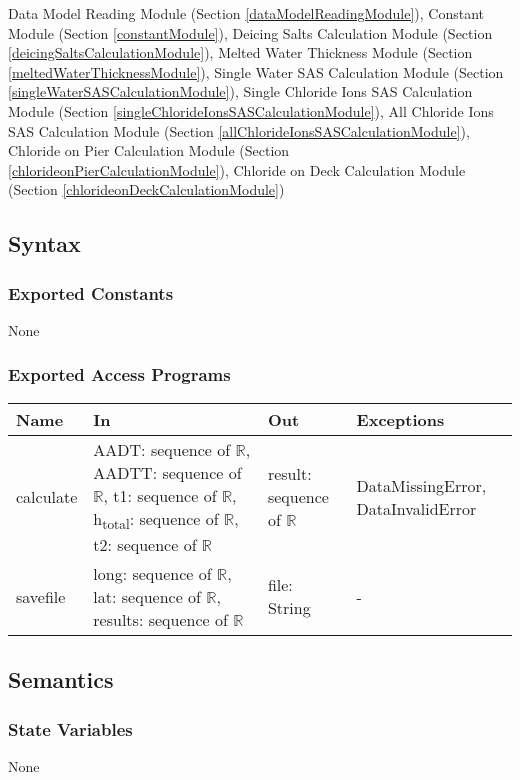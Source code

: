 \documentclass[12pt, titlepage]{article}
\begin{document}
Data Model Reading Module (Section \ref{dataModelReadingModule}), 
Constant Module (Section \ref{constantModule}), Deicing Salts Calculation Module (Section \ref{deicingSaltsCalculationModule}), Melted Water Thickness Module (Section \ref{meltedWaterThicknessModule}), Single Water SAS Calculation Module (Section \ref{singleWaterSASCalculationModule}), Single Chloride Ions SAS Calculation Module (Section \ref{singleChlorideIonsSASCalculationModule}), All Chloride Ions SAS Calculation Module (Section \ref{allChlorideIonsSASCalculationModule}), Chloride on Pier Calculation Module (Section \ref{chlorideonPierCalculationModule}),  Chloride on Deck Calculation Module (Section \ref{chlorideonDeckCalculationModule})


\subsection{Syntax}

\subsubsection{Exported Constants}
None
\subsubsection{Exported Access Programs}

\begin{center}
\begin{tabular}{p{2cm} p{4.5cm} p{4cm} p{4cm}}
\hline
\textbf{Name} & \textbf{In} & \textbf{Out} & \textbf{Exceptions} \\
\hline
calculate & AADT: sequence of $\mathbb{R}$, AADTT: sequence of $\mathbb{R}$, t1: sequence of $\mathbb{R}$, h\textsubscript{total}: sequence of $\mathbb{R}$, t2: sequence of $\mathbb{R}$ & result: sequence of $\mathbb{R}$ & DataMissingError, DataInvalidError \\

savefile & long: sequence of $\mathbb{R}$, lat: sequence of $\mathbb{R}$, results: sequence of $\mathbb{R}$ & file: String & - \\
\hline
\end{tabular}
\end{center}

\subsection{Semantics}


\subsubsection{State Variables}
None
\end{document}
